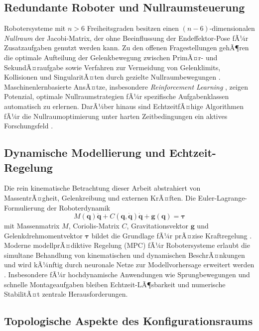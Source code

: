 ﻿\documentclass[a4paper,12pt]{article}
\theoremstyle{definition}
\begin{document}
\subsection{Redundante Roboter und Nullraumsteuerung}

Robotersysteme mit $n > 6$ Freiheitsgraden besitzen einen $(n-6)$-dimensionalen \emph{Nullraum} der Jacobi-Matrix, der ohne Beeinflussung der Endeffektor-Pose fÃ¼r Zusatzaufgaben genutzt werden kann. Zu den offenen Fragestellungen gehÃ¶ren die optimale Aufteilung der Gelenkbewegung zwischen PrimÃ¤r- und SekundÃ¤raufgabe sowie Verfahren zur Vermeidung von Gelenklimits, Kollisionen und SingularitÃ¤ten durch gezielte Nullraumbewegungen \cite{liegeois1977automatic}. Maschinenlernbasierte AnsÃ¤tze, insbesondere \emph{Reinforcement Learning} \cite{sutton2018reinforcement}, zeigen Potenzial, optimale Nullraumstrategien fÃ¼r spezifische Aufgabenklassen automatisch zu erlernen. DarÃ¼ber hinaus sind EchtzeitfÃ¤hige Algorithmen fÃ¼r die Nullraumoptimierung unter harten Zeitbedingungen ein aktives Forschungsfeld \cite{siciliano2009robotics}.

\subsection{Dynamische Modellierung und Echtzeit-Regelung}

Die rein kinematische Betrachtung dieser Arbeit abstrahiert von MassentrÃ¤gheit, Gelenkreibung und externen KrÃ¤ften. Die Euler-Lagrange-Formulierung der Roboterdynamik
\[
	M(\mathbf{q})\ddot{\mathbf{q}} + C(\mathbf{q},\dot{\mathbf{q}})\dot{\mathbf{q}} + \mathbf{g}(\mathbf{q}) = \boldsymbol{\tau}
\]
mit Massenmatrix $M$, Coriolis-Matrix $C$, Gravitationsvektor $\mathbf{g}$ und Gelenkdrehmomentvektor $\boldsymbol{\tau}$ bildet die Grundlage fÃ¼r prÃ¤zise Kraftregelung \cite{spong2020robot}. Moderne modellprÃ¤diktive Regelung (MPC) fÃ¼r Robotersysteme erlaubt die simultane Behandlung von kinematischen und dynamischen BeschrÃ¤nkungen und wird kÃ¼nftig durch neuronale Netze zur Modellvorhersage erweitert werden \cite{rawlings2017model}. Insbesondere fÃ¼r hochdynamische Anwendungen wie Sprungbewegungen und schnelle Montageaufgaben bleiben Echtzeit-LÃ¶sbarkeit und numerische StabilitÃ¤t zentrale Herausforderungen.

\subsection{Topologische Aspekte des Konfigurationsraums}
\end{document}
